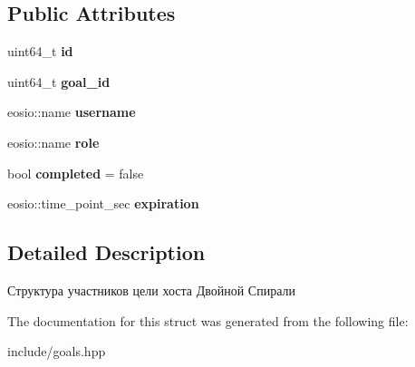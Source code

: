 \subsection*{Public Attributes}
\begin{DoxyCompactItemize}
\item 
\mbox{\label{structgoalspartic_a4a827ab1581493d26766fc29ed68933e}} 
uint64\+\_\+t {\bfseries id}
\item 
\mbox{\label{structgoalspartic_a620bde3995640d4acc18208df2f8264d}} 
uint64\+\_\+t {\bfseries goal\+\_\+id}
\item 
\mbox{\label{structgoalspartic_a5ae546f7c77d86d1957a92477b7a5b55}} 
eosio\+::name {\bfseries username}
\item 
\mbox{\label{structgoalspartic_aed6900ac72c882538987c931b8f035b4}} 
eosio\+::name {\bfseries role}
\item 
\mbox{\label{structgoalspartic_ae9528d5bc4ed1f26b120954d5f4b3569}} 
bool {\bfseries completed} = false
\item 
\mbox{\label{structgoalspartic_a7ddf89793918e5a656ce62408ed44808}} 
eosio\+::time\+\_\+point\+\_\+sec {\bfseries expiration}
\end{DoxyCompactItemize}


\subsection{Detailed Description}
Структура участников цели хоста Двойной Спирали 

The documentation for this struct was generated from the following file\+:\begin{DoxyCompactItemize}
\item 
include/goals.\+hpp\end{DoxyCompactItemize}
